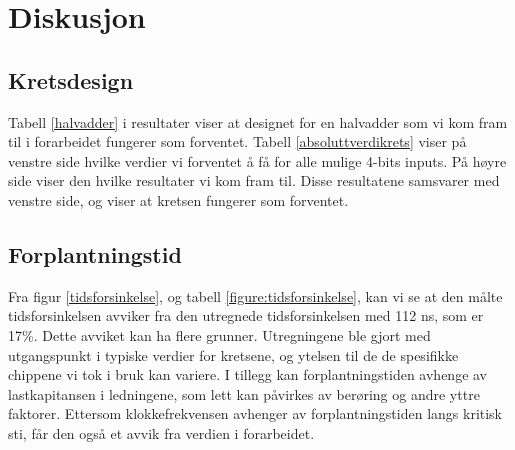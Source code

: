 \section{Diskusjon}

\subsection{Kretsdesign}
Tabell \ref{halvadder} i resultater viser at designet for en halvadder som vi kom fram til i forarbeidet fungerer som forventet.
Tabell \ref{absoluttverdikrets} viser på venstre side hvilke verdier vi forventet å få for alle mulige 4-bits inputs. På høyre side viser den hvilke resultater vi kom fram til. Disse resultatene samsvarer med venstre side, og viser at kretsen fungerer som forventet.

\subsection{Forplantningstid}
Fra figur \ref{tidsforsinkelse}, og tabell \ref{figure:tidsforsinkelse}, kan vi se at den målte tidsforsinkelsen avviker fra den utregnede tidsforsinkelsen med 112 ns, som er 17\%. Dette avviket kan ha flere grunner. Utregningene ble gjort med utgangspunkt i typiske verdier for kretsene, og ytelsen til de de spesifikke chippene vi tok i bruk kan variere. I tillegg kan forplantningstiden avhenge av lastkapitansen i ledningene, som lett kan påvirkes av berøring og andre yttre faktorer. Ettersom klokkefrekvensen avhenger av forplantningstiden langs kritisk sti, får den også et avvik fra verdien i forarbeidet.
